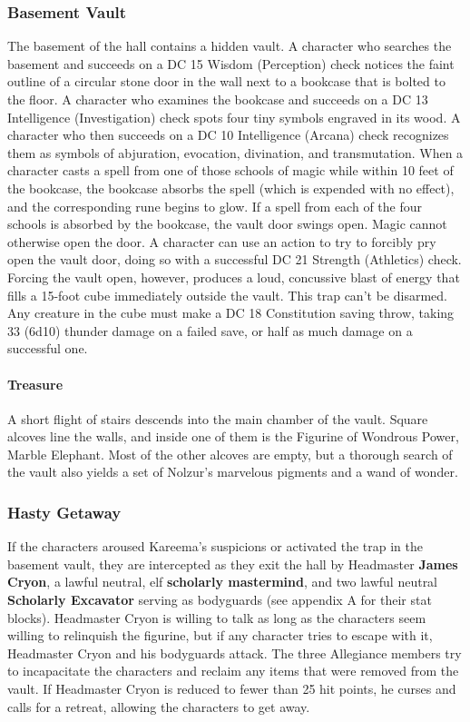 \documentclass[10pt,a4,twoside,twocolumn,openany,nodeprecatedcode]{dndbook}
\begin{document}
\subsubsection{Basement Vault}
The basement of the hall contains a hidden vault. A character who searches the basement and succeeds on a DC 15 Wisdom (Perception) check notices the faint outline of a circular stone door in the wall next to a bookcase that is bolted to the floor.
A character who examines the bookcase and succeeds on a DC 13 Intelligence (Investigation) check spots four tiny symbols engraved in its wood. A character who then succeeds on a DC 10 Intelligence (Arcana) check recognizes them as symbols of abjuration, evocation, divination, and transmutation. When a character casts a spell from one of those schools of magic while within 10 feet of the bookcase, the bookcase absorbs the spell (which is expended with no effect), and the corresponding rune begins to glow. If a spell from each of the four schools is absorbed by the bookcase, the vault door swings open. Magic cannot otherwise open the door.
A character can use an action to try to forcibly pry open the vault door, doing so with a successful DC 21 Strength (Athletics) check. Forcing the vault open, however, produces a loud, concussive blast of energy that fills a 15-foot cube immediately outside the vault. This trap can't be disarmed. Any creature in the cube must make a DC 18 Constitution saving throw, taking 33 (6d10) thunder damage on a failed save, or half as much damage on a successful one.
\paragraph{Treasure}
A short flight of stairs descends into the main chamber of the vault. Square alcoves line the walls, and inside one of them is the Figurine of Wondrous Power, Marble Elephant.
Most of the other alcoves are empty, but a thorough search of the vault also yields a set of Nolzur's marvelous pigments and a wand of wonder.
\subsubsection{Hasty Getaway}
If the characters aroused Kareema's suspicions or activated the trap in the basement vault, they are intercepted as they exit the hall by Headmaster \textbf{James Cryon}, a lawful neutral, elf \textbf{scholarly mastermind}, and two lawful neutral \textbf{Scholarly Excavator} serving as bodyguards (see appendix A for their stat blocks). Headmaster Cryon is willing to talk as long as the characters seem willing to relinquish the figurine, but if any character tries to escape with it, Headmaster Cryon and his bodyguards attack.
The three Allegiance members try to incapacitate the characters and reclaim any items that were removed from the vault. If Headmaster Cryon is reduced to fewer than 25 hit points, he curses and calls for a retreat, allowing the characters to get away.
\end{document}
